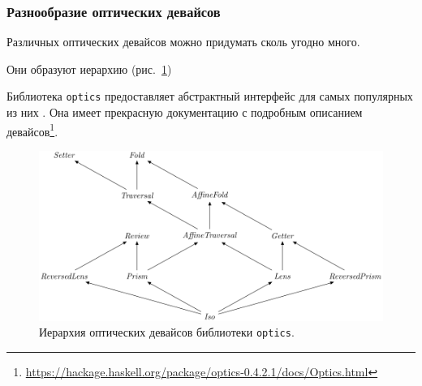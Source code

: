 \subsubsection{Разнообразие оптических девайсов}

Различных оптических девайсов можно придумать сколь угодно много.




Они образуют иерархию (рис.~\ref{fig:optics-hierarchy})



Библиотека \texttt{optics} предоставляет абстрактный интерфейс для самых популярных из них .
Она имеет прекрасную документацию с подробным описанием девайсов\footnote{\url{https://hackage.haskell.org/package/optics-0.4.2.1/docs/Optics.html}}.

\begin{figure}
    \centering
    \includegraphics[width=\textwidth]{figs/optics-hierarchy}
    \caption{Иерархия оптических девайсов библиотеки \texttt{optics}.}
    \label{fig:optics-hierarchy}
\end{figure}








%



%
%

